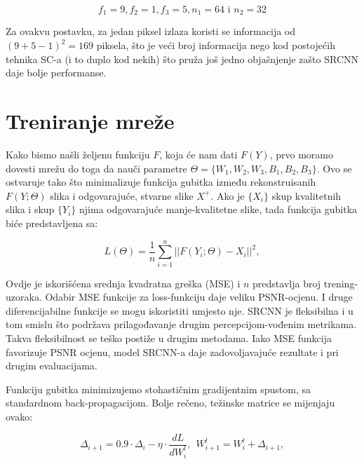 \documentclass[12pt]{report}
\numberwithin{equation}{section}
\begin{document}
\begin{equation}
  f_1 = 9, f_2 = 1, f_3 = 5, n_1 = 64 \text{ i } n_2 = 32
\end{equation}


 Za ovakvu postavku, za jedan piksel izlaza koristi se informacija  od $(9 + 5 - 1)^2 = 169$ piksela, što je veći broj informacija nego kod postojećih tehnika SC-a  (i to duplo kod nekih) što pruža još jedno objašnjenje zašto SRCNN daje bolje performanse.  

\section{Treniranje mreže}\label{ch2}


Kako bismo našli željenu funkciju $F$, koja će nam dati $F(Y)$, prvo moramo dovesti mrežu do toga da nauči parametre $\Theta = \{W_1 , W_2 , W_3 , B_1 , B_2 , B_3\}$. Ovo se ostvaruje tako što minimalizuje funkcija gubitka između rekonstruisanih $F(Y; \Theta)$ slika i odgovarajuće, stvarne slike $X^{+}$. Ako je $\{X_i\}$ skup kvalitetnih slika i skup $\{Y_i\}$ njima odgovarajuće manje-kvalitetne slike, tada funkcija gubitka biće predstavljena sa:  

\begin{equation}
  L(\Theta) = \frac{1}{n} \sum\limits_{i=1}^{n}{||F(Y_i; \Theta) - X_i ||}^2 ,
\end{equation}

Ovdje je iskorišćena srednja kvadratna greška (MSE) i $n$ predstavlja broj trening-uzoraka. Odabir MSE funkcije za loss-funkciju daje veliku PSNR-ocjenu. I druge diferencijabilne funkcije se mogu iskoristiti umjesto nje. SRCNN je fleksibilna i u tom smislu što podržava prilagođavanje drugim percepcijom-vođenim metrikama. Takva fleksibilnost se teško postiže u drugim metodama. Iako MSE funkcija favorizuje PSNR ocjenu, model SRCNN-a daje zadovoljavajuće rezultate i pri drugim evaluacijama.

Funkciju gubitka minimizujemo stohastičnim gradijentnim spustom, sa standardnom back-propagacijom. Bolje rečeno, težinske matrice se mijenjaju ovako: 

\begin{equation}
  \Delta_{i+1} = 0.9 \cdot \Delta_i - \eta \cdot \frac{dL}{dW_{i}^{l}}, \ \ W_{i+1}^{l}=W_{i}^{l}+\Delta_{i+1},
\end{equation}
 

\end{document}
